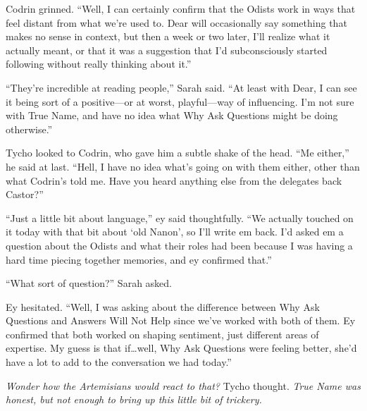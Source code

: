 Codrin grinned. ``Well, I can certainly confirm that the Odists work in ways that feel distant from what we're used to. Dear will occasionally say something that makes no sense in context, but then a week or two later, I'll realize what it actually meant, or that it was a suggestion that I'd subconsciously started following without really thinking about it.''

``They're incredible at reading people,'' Sarah said. ``At least with Dear, I can see it being sort of a positive—or at worst, playful—way of influencing. I'm not sure with True Name, and have no idea what Why Ask Questions might be doing otherwise.''

Tycho looked to Codrin, who gave him a subtle shake of the head. ``Me either,'' he said at last. ``Hell, I have no idea what's going on with them either, other than what Codrin's told me. Have you heard anything else from the delegates back Castor?''

``Just a little bit about language,'' ey said thoughtfully. ``We actually touched on it today with that bit about `old Nanon', so I'll write em back. I'd asked em a question about the Odists and what their roles had been because I was having a hard time piecing together memories, and ey confirmed that.''

``What sort of question?'' Sarah asked.

Ey hesitated. ``Well, I was asking about the difference between Why Ask Questions and Answers Will Not Help since we've worked with both of them. Ey confirmed that both worked on shaping sentiment, just different areas of expertise. My guess is that if\ldots well, Why Ask Questions were feeling better, she'd have a lot to add to the conversation we had today.''

\emph{Wonder how the Artemisians would react to that?} Tycho thought. \emph{True Name was honest, but not enough to bring up this little bit of trickery.}
